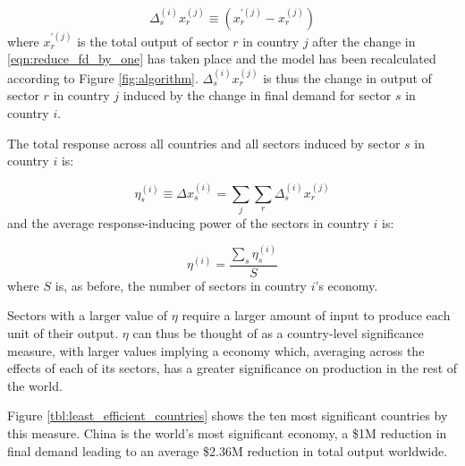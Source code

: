 \documentclass[a4paper]{article}
\begin{document}
\begin{equation}
    \Delta_{s}^{(i)} x_{r}^{(j)} \equiv (x_{r}^{\prime(j)} - x_r^{(j)})
\end{equation}
where $x_{r}^{\prime(j)}$ is the total output of sector $r$ in country $j$ after the change in \cref{eqn:reduce_fd_by_one} has taken place and the model has been recalculated according to Figure \ref{fig:algorithm}.
$\Delta_{s}^{(i)} x_{r}^{(j)}$ is thus the change in output of sector $r$ in country $j$ induced by the change in final demand for sector $s$ in country $i$.

The total response across all countries and all sectors induced by sector $s$ in country $i$ is:

\begin{equation}
    \eta_s^{(i)} \equiv \Delta x_{s}^{(i)} = \sum_j \sum_r \Delta_{s}^{(i)} x_{r}^{(j)}
\end{equation}
and the average response-inducing power of the sectors in country $i$ is:

\begin{equation}
    \eta^{(i)} = \frac{\sum_s \eta_s^{(i)}}{S}
\end{equation}
where $S$ is, as before, the number of sectors in country $i$'s economy.

Sectors with a larger value of $\eta$ require a larger amount of input to produce each unit of their output. $\eta$ can thus be thought of as a country-level significance measure, with larger values implying a economy which, averaging across the effects of each of its sectors, has a greater significance on production in the rest of the world.

Figure \ref{tbl:least_efficient_countries} shows the ten most significant countries by this measure.
China is the world's most significant economy, a \$1M reduction in final demand leading to an average \$2.36M reduction in total output worldwide.
\end{document}
